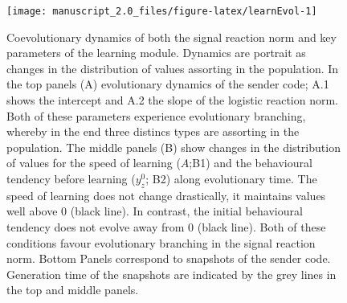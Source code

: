 \documentclass[
  12pt,
]{article}
\begin{document}
\begin{figure}

{\centering \texttt{[image: manuscript\_2.0\_files/figure-latex/learnEvol-1]} 

}

\caption{Coevolutionary dynamics of both the signal reaction norm and key parameters of the learning module. Dynamics are portrait as changes in the distribution of values assorting in the population. In the top panels (A)  evolutionary dynamics of the sender code; A.1 shows the intercept and A.2 the slope of the logistic reaction norm. Both of these parameters experience evolutionary branching, whereby in the end three distincs types are assorting in the population. The middle panels (B) show changes in the distribution of values for the speed of learning ($A$;B1) and the behavioural tendency before learning ($y_z^0$; B2) along evolutionary time. The speed of learning does not change drastically, it maintains values well above 0 (black line). In contrast, the initial behavioural tendency does not evolve away from 0 (black line). Both of these conditions favour evolutionary branching in the signal reaction norm. Bottom Panels correspond to snapshots of the sender code. Generation time of the snapshots are indicated by the grey lines in the top and middle panels.}\label{fig:learnEvol}
\end{figure}

\newpage
\small
\end{document}
